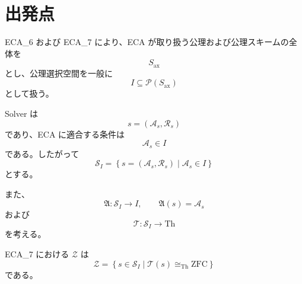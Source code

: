 \documentclass[a4paper,11pt]{article}
\newcommand{\Solver}{\mathcal{S}}
\newcommand{\Ax}{S_{\mathrm{ax}}}
\newcommand{\Sel}{I}
\newcommand{\Th}{\mathrm{Th}}
\begin{document}
\begin{abstract}
ECA_10 では、可算無限な公理候補族
\[
\mathcal{R}^{*}=\{r_0,r_1,r_2,\ldots\}\subseteq\Ax
\]
を用いて、任意の部分集合 $A\subseteq\mathcal{R}^{*}$ から
\[
s_A=
\left(
\mathcal{A}_{\mathrm{ZFC}}\cup A,\mathcal{R}_0
\right)
\]
を構成し、すべての $s_A$ が $\mathcal{Z}$ に属するならば
\[
\mathcal{P}(\mathcal{R}^{*})\hookrightarrow\mathcal{Z}
\]
が得られることを示した。

本稿では、この「ZFC 保存族」が現行 ECA の既存の公理候補全体
$\Ax$ から実際に構成できるかを検討する。特に、現行 ECA において
$\Ax$ が「公理および公理スキームの全体」と定義されていること、および
Solver が
\[
s=(\mathcal{A}_s,\mathcal{R}_s)
\]
として構成されることを前提とし、候補となる構成方法を区別する。

結論として、現行 ECA の定義だけから可算無限の ZFC 保存族
$\mathcal{R}^{*}\subseteq\Ax$ の存在を導くことはできない。
特に、ZFC から証明可能な文を任意に「公理候補」として $\Ax$ に加える構成、
あるいは同値な公理の無限族を $\Ax$ に含める構成は、現行定義には明示されていない。
したがって、$\mathcal{P}(\mathcal{R}^{*})\hookrightarrow\mathcal{Z}$ を公理選択の差から
構成するためには、追加の公理・構成条件が必要である。

一方、Solver の推論・構成規則 $\mathcal{R}_s$ を変えることで、同一の公理選択から
異なる Solver を得る可能性は、現行構造と矛盾しない。ただし、この方法は
$\mathfrak{A}$ の像を増やす方法ではなく、$\mathcal{Z}$ の同一公理選択上の
ファイバーを増やす方法として扱う必要がある。
\end{abstract}

\section{出発点}

ECA_6 および ECA_7 により、ECA が取り扱う公理および公理スキームの全体を
\[
\Ax
\]
とし、公理選択空間を一般に
\[
\Sel\subseteq\mathcal{P}(\Ax)
\]
として扱う。

Solver は
\[
s=(\mathcal{A}_s,\mathcal{R}_s)
\]
であり、ECA に適合する条件は
\[
\mathcal{A}_s\in\Sel
\]
である。したがって
\[
\Solver_{\Sel}
=
\left\{
s=(\mathcal{A}_s,\mathcal{R}_s)
\mid
\mathcal{A}_s\in\Sel
\right\}
\]
とする。

また、
\[
\mathfrak{A}:\Solver_{\Sel}\longrightarrow\Sel,
\qquad
\mathfrak{A}(s)=\mathcal{A}_s
\]
および
\[
\mathcal{T}:\Solver_{\Sel}\longrightarrow\Th
\]
を考える。

ECA_7 における $\mathcal{Z}$ は
\[
\boxed{
\mathcal{Z}
=
\left\{
s\in\Solver_{\Sel}
\mid
\mathcal{T}(s)\cong_{\mathrm{Th}}\mathrm{ZFC}
\right\}
}
\]
である。
\end{document}
